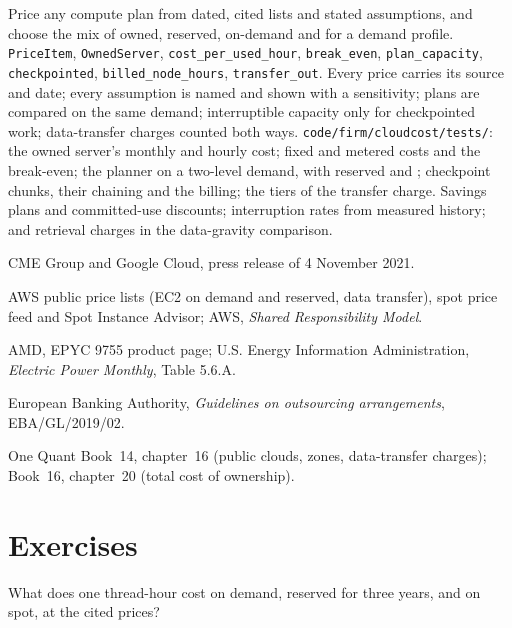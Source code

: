 \begin{build}
 Price any compute plan from dated, cited lists and stated assumptions, and choose the mix of owned, reserved, on-demand and
 for a demand profile.
 \texttt{PriceItem}, \texttt{OwnedServer}, \texttt{cost\_per\_used\_hour}, \texttt{break\_even}, \texttt{plan\_capacity},
\texttt{checkpointed}, \texttt{billed\_node\_hours}, \texttt{transfer\_out}.
 Every price carries its source and date; every assumption is named and shown with a sensitivity; plans are compared on the
same demand; interruptible capacity only for checkpointed work; data-transfer charges counted both ways.
 \texttt{code/firm/cloudcost/tests/}: the owned server's monthly and hourly cost; fixed and metered costs and the
break-even; the planner on a two-level demand, with reserved and ; checkpoint chunks, their chaining and the billing; the tiers of
the transfer charge.
 Savings plans and committed-use discounts; interruption rates from measured history;  and retrieval charges in
the data-gravity comparison.
\end{build}

\begin{omsources}
\item CME Group and Google Cloud, press release of 4 November 2021.
\item AWS public price lists (EC2 on demand and reserved, data transfer), spot price feed and Spot Instance Advisor; AWS, \emph{Shared
Responsibility Model}.
\item AMD, EPYC 9755 product page; U.S. Energy Information Administration, \emph{Electric Power Monthly}, Table 5.6.A.
\item European Banking Authority, \emph{Guidelines on outsourcing arrangements}, EBA/GL/2019/02.
\item One Quant Book~14, chapter~16 (public clouds, zones, data-transfer charges); Book~16, chapter~20 (total cost of ownership).
\end{omsources}

\section{Exercises}

\begin{exercise}[$\star$]\label{exo:pl:cloud-against-on-premises:1}
What does one thread-hour cost on demand, reserved for three years, and on spot, at the cited prices?
\end{exercise}

